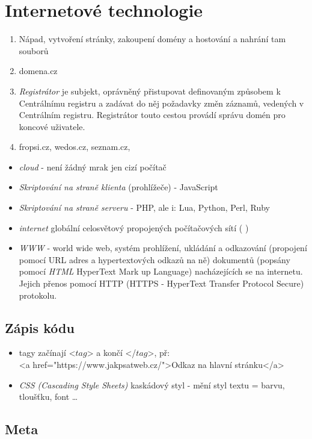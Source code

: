 \documentclass[12pt]{article}
\begin{document}
\section{Internetové technologie}
\begin{enumerate}
\item Nápad, vytvoření stránky, zakoupení domény a hostování a nahrání tam souborů
\item domena.cz
\item \emph{Registrátor} je subjekt, oprávněný přistupovat definovaným způsobem k Centrálnímu registru a zadávat do něj požadavky změn záznamů, vedených v Centrálním registru. Registrátor touto cestou provádí správu domén pro koncové uživatele.
\item fropsi.cz, wedos.cz, seznam.cz, 
\end{enumerate}
\begin{itemize}
\label{sec:internet_technologie}
\item \emph{cloud} - není žádný mrak jen cizí počítač
\item \emph{Skriptování na straně klienta} (prohlížeče) - JavaScript
\item \emph{Skriptování na straně serveru} - PHP, ale i:  Lua, Python, Perl, Ruby
\item \emph{internet} globální celosvětový propojených počítačových sítí ( )
\item \emph{WWW} - world wide web, systém prohlížení, ukládání a odkazování (propojení pomocí URL adres a hypertextových odkazů na ně) dokumentů (popsány pomocí \emph{HTML} HyperText Mark up Language) nacházejících se na internetu. Jejich přenos pomocí HTTP (HTTPS - HyperText Transfer Protocol Secure) protokolu.
\end{itemize}
\subsection{Zápis kódu}
\begin{itemize}
\item tagy začínají <$tag$> a končí </$tag$>, př:\\
<a href="https://www.jakpsatweb.cz/">Odkaz na hlavní stránku</a>
\item \emph{CSS (Cascading Style Sheets)} kaskádový styl - mění styl textu = barvu, tloušťku, font \dots
\end{itemize}
\subsection{Meta}
\end{document}
